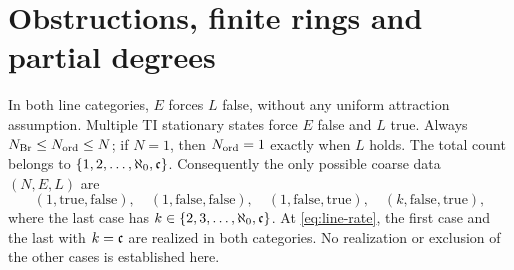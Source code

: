 \section{Obstructions, finite rings and partial degrees}\label{sec:line-obstructions}
\begin{theorem}\label{thm:line-obstructions}
In both line categories, $E$ forces $L$ false, without any uniform
attraction assumption. Multiple TI stationary states force $E$ false
and $L$ true. Always $N_{\mathrm{Br}}\le N_{\mathrm{ord}}\le N$; if $N=1$, then
$N_{\mathrm{ord}}=1$ exactly when $L$ holds.
The total count belongs to $\{1,2,\ldots,\aleph_0,\mathfrak c\}$.
Consequently the only possible coarse data $(N,E,L)$ are
\[
 (1,\mathrm{true},\mathrm{false}),\quad
 (1,\mathrm{false},\mathrm{false}),\quad
 (1,\mathrm{false},\mathrm{true}),\quad
 (k,\mathrm{false},\mathrm{true}),
\]
where the last case has $k\in\{2,3,\ldots,\aleph_0,\mathfrak c\}$.
At \eqref{eq:line-rate}, the first case and the last with $k=\mathfrak c$
are realized in both categories. No realization or exclusion of
the other cases is established here.
\end{theorem}
